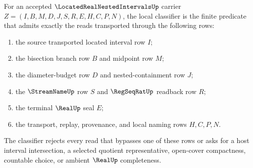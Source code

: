\begin{definition}
\label{def:located-real-nested-intervals-classifier}
For an accepted $\LocatedRealNestedIntervalsUp$ carrier $Z=(I,B,M,D,J,S,R,E,H,C,P,N)$, the local classifier is the finite predicate that admits exactly the reads transported through the following rows:
\begin{enumerate}
\item the source transported located interval row $I$;
\item the bisection branch row $B$ and midpoint row $M$;
\item the diameter-budget row $D$ and nested-containment row $J$;
\item the $\StreamNameUp$ row $S$ and $\RegSeqRatUp$ readback row $R$;
\item the terminal $\RealUp$ seal $E$;
\item the transport, replay, provenance, and local naming rows $H,C,P,N$.
\end{enumerate}
The classifier rejects every read that bypasses one of these rows or asks for a host interval intersection, a selected quotient representative, open-cover compactness, countable choice, or ambient $\RealUp$ completeness.
\end{definition}

